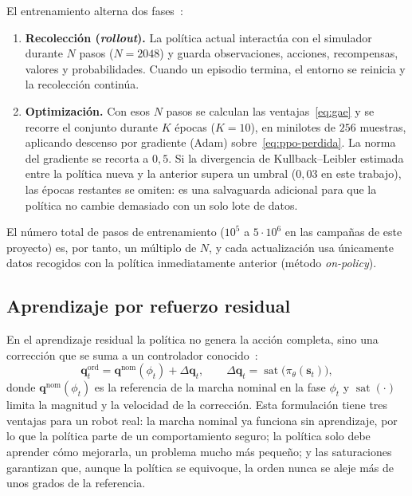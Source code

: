 El entrenamiento alterna dos fases~\cite{schulman2017ppo,raffin2021sb3}:
\begin{enumerate}
    \item \textbf{Recolección (\emph{rollout}).} La política actual interactúa con el simulador durante $N$ pasos ($N=2048$) y guarda observaciones, acciones, recompensas, valores y probabilidades. Cuando un episodio termina, el entorno se reinicia y la recolección continúa.
    \item \textbf{Optimización.} Con esos $N$ pasos se calculan las ventajas~\eqref{eq:gae} y se recorre el conjunto durante $K$ épocas ($K=10$), en minilotes de $256$ muestras, aplicando descenso por gradiente (Adam) sobre~\eqref{eq:ppo-perdida}. La norma del gradiente se recorta a $0{,}5$. Si la divergencia de Kullback--Leibler estimada entre la política nueva y la anterior supera un umbral ($0{,}03$ en este trabajo), las épocas restantes se omiten: es una salvaguarda adicional para que la política no cambie demasiado con un solo lote de datos.
\end{enumerate}
El número total de pasos de entrenamiento ($10^5$ a $5\cdot10^6$ en las campañas de este proyecto) es, por tanto, un múltiplo de $N$, y cada actualización usa únicamente datos recogidos con la política inmediatamente anterior (método \emph{on-policy}).

\subsection{Aprendizaje por refuerzo residual}

En el aprendizaje residual la política no genera la acción completa, sino una corrección que se suma a un controlador conocido~\cite{johannink2019residual}:
\begin{equation}
    \mathbf{q}^{\text{ord}}_t=\mathbf{q}^{\text{nom}}(\phi_t)+\Delta\mathbf{q}_t,\qquad \Delta\mathbf{q}_t=\operatorname{sat}\big(\pi_\theta(\mathbf{s}_t)\big),
    \label{eq:residual}
\end{equation}
donde $\mathbf{q}^{\text{nom}}(\phi_t)$ es la referencia de la marcha nominal en la fase $\phi_t$ y $\operatorname{sat}(\cdot)$ limita la magnitud y la velocidad de la corrección. Esta formulación tiene tres ventajas para un robot real: la marcha nominal ya funciona sin aprendizaje, por lo que la política parte de un comportamiento seguro; la política solo debe aprender cómo mejorarla, un problema mucho más pequeño; y las saturaciones garantizan que, aunque la política se equivoque, la orden nunca se aleje más de unos grados de la referencia.

